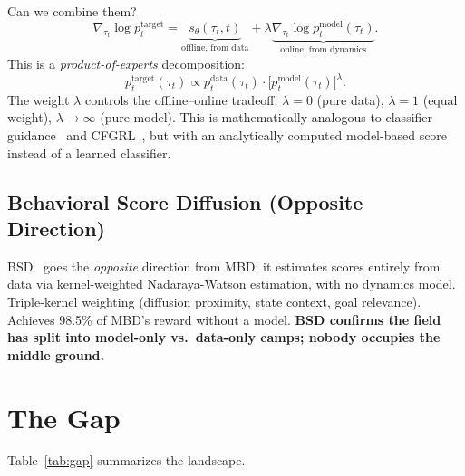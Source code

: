 \documentclass[letterpaper, 10pt, conference]{ieeeconf}
\newcommand{\scoredata}{s_\theta(\tau_t,t)}
\newcommand{\scoremodel}{\nabla_{\tau_t}\log p_t^{\mathrm{model}}(\tau_t)}
\begin{document}
Can we combine them?
\begin{equation}
  \nabla_{\tau_t}\log p_t^{\mathrm{target}}
  = \underbrace{\scoredata}_{\text{offline, from data}}
  + \lambda\underbrace{\scoremodel}_{\text{online, from dynamics}}.
  \label{eq:poe_score}
\end{equation}
This is a \emph{product-of-experts} decomposition:
\begin{equation}
  p_t^{\mathrm{target}}(\tau_t)
  \propto p_t^{\mathrm{data}}(\tau_t)\cdot
  \bigl[p_t^{\mathrm{model}}(\tau_t)\bigr]^\lambda.
  \label{eq:poe}
\end{equation}
The weight $\lambda$ controls the offline--online tradeoff:
$\lambda=0$ (pure data), $\lambda=1$ (equal weight), $\lambda\to\infty$ (pure model).
This is mathematically analogous to classifier guidance~\cite{dhariwal2021diffusion}
and CFGRL~\cite{cfgrl}, but with an analytically computed
model-based score instead of a learned classifier.

\subsection{Behavioral Score Diffusion (Opposite Direction)}

BSD~\cite{bsd} goes the \emph{opposite} direction from MBD: it estimates
scores entirely from data via kernel-weighted Nadaraya-Watson estimation,
with no dynamics model. Triple-kernel weighting (diffusion proximity, state
context, goal relevance). Achieves 98.5\% of MBD's reward without a model.
\textbf{BSD confirms the field has split into model-only vs.\ data-only camps;
nobody occupies the middle ground.}

\section{The Gap}
\label{sec:gap}

Table~\ref{tab:gap} summarizes the landscape.
\end{document}
